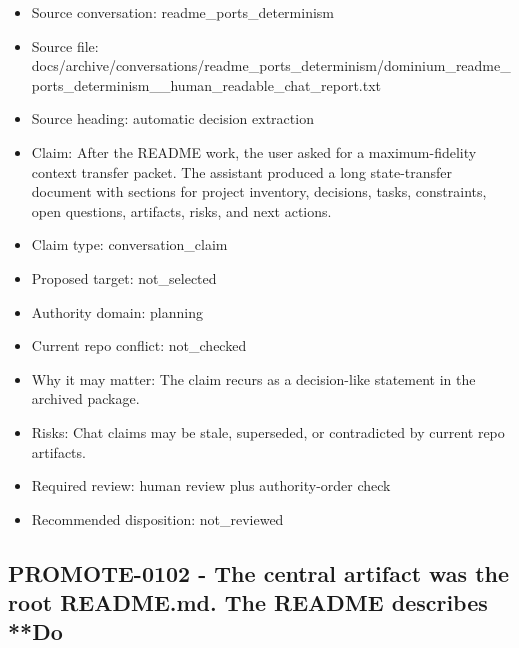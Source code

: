 \documentclass[11pt,a4paper]{report}
\begin{document}
\begin{itemize}
\item Source conversation: readme\_ports\_determinism
\item Source file: docs/archive/conversations/readme\_ports\_determinism/dominium\_readme\_ports\_determinism\_\_human\_readable\_chat\_report.txt
\item Source heading: automatic decision extraction
\item Claim: After the README work, the user asked for a maximum-fidelity context transfer packet. The assistant produced a long state-transfer document with sections for project inventory, decisions, tasks, constraints, open questions, artifacts, risks, and next actions.
\item Claim type: conversation\_claim
\item Proposed target: not\_selected
\item Authority domain: planning
\item Current repo conflict: not\_checked
\item Why it may matter: The claim recurs as a decision-like statement in the archived package.
\item Risks: Chat claims may be stale, superseded, or contradicted by current repo artifacts.
\item Required review: human review plus authority-order check
\item Recommended disposition: not\_reviewed
\end{itemize}

\subsection{PROMOTE-0102 - The central artifact was the root README.md. The README describes **Do}
\end{document}
